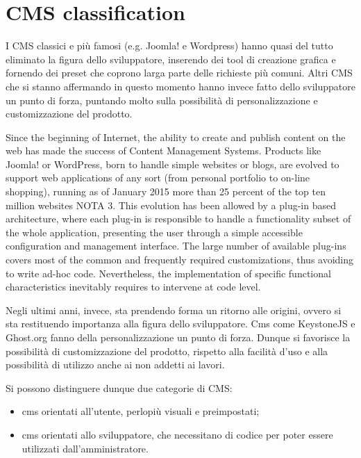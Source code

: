 \section{CMS classification}
\label{sec:CMS_class}

I CMS classici e più famosi (e.g. Joomla! e Wordpress) hanno quasi del tutto eliminato la figura dello sviluppatore, inserendo dei tool di creazione grafica e fornendo dei preset che coprono larga parte delle richieste più comuni. Altri CMS che si stanno affermando in questo momento hanno invece fatto dello sviluppatore un punto di forza, puntando molto sulla possibilità di personalizzazione e customizzazione del prodotto.

Since the beginning of Internet, the ability to create and publish content on the web has made the success of Content Management Systems. Products like Joomla! or WordPress, born to handle simple websites or blogs, are evolved to support web applications of any sort (from personal portfolio to on-line shopping), running as of January 2015 more than 25 percent of the top ten million websites NOTA 3. This evolution has been allowed by a plug-in based architecture, where each plug-in is responsible to handle a functionality subset of the whole application, presenting the user through a simple accessible configuration and management interface.
The large number of available plug-ins covers most of the common and frequently required customizations, thus avoiding to write ad-hoc code. Nevertheless, the implementation of specific functional characteristics inevitably requires to intervene at code level.

Negli ultimi anni, invece, sta prendendo forma un ritorno alle origini, ovvero si sta restituendo importanza alla figura dello sviluppatore. Cms come KeystoneJS e Ghost.org fanno della personalizzazione un punto di forza.
Dunque si favorisce la possibilità di customizzazione del prodotto, rispetto alla facilità d'uso e alla possibilità di utilizzo anche ai non addetti ai lavori. 

Si possono distinguere dunque due categorie di CMS:
\begin{itemize}

\item cms orientati all'utente, perlopiù visuali e preimpostati;
\item cms orientati allo sviluppatore, che necessitano di codice per poter essere utilizzati dall'amministratore.

\end{itemize}